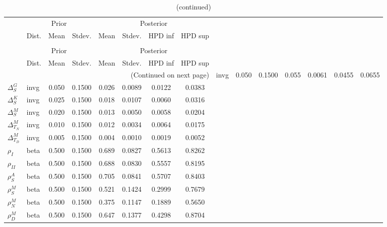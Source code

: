  
\begin{center}
\begin{longtable}{llcccccc} 
\caption{Results from Metropolis-Hastings (parameters)}
 \label{Table:MHPosterior:1}\\
\toprule 
  & \multicolumn{3}{c}{Prior}  &  \multicolumn{4}{c}{Posterior} \\
  \cmidrule(r{.75em}){2-4} \cmidrule(r{.75em}){5-8}
  & Dist. & Mean  & Stdev. & Mean & Stdev. & HPD inf & HPD sup\\
\midrule \endfirsthead 
\caption{(continued)}\\\toprule 
  & \multicolumn{3}{c}{Prior}  &  \multicolumn{4}{c}{Posterior} \\
  \cmidrule(r{.75em}){2-4} \cmidrule(r{.75em}){5-8}
  & Dist. & Mean  & Stdev. & Mean & Stdev. & HPD inf & HPD sup\\
\midrule \endhead 
\bottomrule \multicolumn{8}{r}{(Continued on next page)} \endfoot 
\bottomrule \endlastfoot 
${\Delta^{A}_{S}}$ & invg &   0.050 & 0.1500 &   0.055& 0.0061 &  0.0455 &  0.0655 \\ 
${\Delta^{G}_{S}}$ & invg &   0.050 & 0.1500 &   0.026& 0.0089 &  0.0122 &  0.0383 \\ 
${\Delta^{K}_{S}}$ & invg &   0.025 & 0.1500 &   0.018& 0.0107 &  0.0060 &  0.0316 \\ 
${\Delta^{M}_{S}}$ & invg &   0.020 & 0.1500 &   0.013& 0.0050 &  0.0058 &  0.0204 \\ 
${\Delta^{M}_{T_N}}$ & invg &   0.010 & 0.1500 &   0.012& 0.0034 &  0.0064 &  0.0175 \\ 
${\Delta^{M}_{T_D}}$ & invg &   0.005 & 0.1500 &   0.004& 0.0010 &  0.0019 &  0.0052 \\ 
${\rho_{I}}$ & beta &   0.500 & 0.1500 &   0.689& 0.0827 &  0.5613 &  0.8262 \\ 
${\rho_{II}}$ & beta &   0.500 & 0.1500 &   0.688& 0.0830 &  0.5557 &  0.8195 \\ 
${\rho^{A}_{S}}$ & beta &   0.500 & 0.1500 &   0.705& 0.0841 &  0.5707 &  0.8403 \\ 
${\rho^{M}_{S}}$ & beta &   0.500 & 0.1500 &   0.521& 0.1424 &  0.2999 &  0.7679 \\ 
${\rho^{M}_{N}}$ & beta &   0.500 & 0.1500 &   0.375& 0.1147 &  0.1889 &  0.5650 \\ 
${\rho^{M}_{D}}$ & beta &   0.500 & 0.1500 &   0.647& 0.1377 &  0.4298 &  0.8704 \\ 
\end{longtable}
 \end{center}
